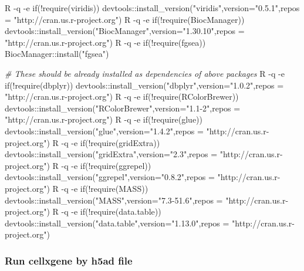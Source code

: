 \documentclass[
]{article}
\newenvironment{Shaded}{\begin{snugshade}}{\end{snugshade}}
\newcommand{\AttributeTok}[1]{\textcolor[rgb]{0.77,0.63,0.00}{#1}}
\newcommand{\CommentTok}[1]{\textcolor[rgb]{0.56,0.35,0.01}{\textit{#1}}}
\newcommand{\ExtensionTok}[1]{#1}
\newcommand{\StringTok}[1]{\textcolor[rgb]{0.31,0.60,0.02}{#1}}
\begin{document}
\begin{Shaded}
\begin{Highlighting}[]
\ExtensionTok{R} \AttributeTok{{-}q} \AttributeTok{{-}e} \StringTok{\textquotesingle{}if(!require(viridis)) devtools::install\_version("viridis",version="0.5.1",repos = "http://cran.us.r{-}project.org")\textquotesingle{}}
\ExtensionTok{R} \AttributeTok{{-}q} \AttributeTok{{-}e} \StringTok{\textquotesingle{}if(!require(BiocManager)) devtools::install\_version("BiocManager",version="1.30.10",repos = "http://cran.us.r{-}project.org")\textquotesingle{}}
\ExtensionTok{R} \AttributeTok{{-}q} \AttributeTok{{-}e} \StringTok{\textquotesingle{}if(!require(fgsea)) BiocManager::install("fgsea")\textquotesingle{}}

\CommentTok{\# These should be already installed as dependencies of above packages}
\ExtensionTok{R} \AttributeTok{{-}q} \AttributeTok{{-}e} \StringTok{\textquotesingle{}if(!require(dbplyr)) devtools::install\_version("dbplyr",version="1.0.2",repos = "http://cran.us.r{-}project.org")\textquotesingle{}}
\ExtensionTok{R} \AttributeTok{{-}q} \AttributeTok{{-}e} \StringTok{\textquotesingle{}if(!require(RColorBrewer)) devtools::install\_version("RColorBrewer",version="1.1{-}2",repos = "http://cran.us.r{-}project.org")\textquotesingle{}}
\ExtensionTok{R} \AttributeTok{{-}q} \AttributeTok{{-}e} \StringTok{\textquotesingle{}if(!require(glue)) devtools::install\_version("glue",version="1.4.2",repos = "http://cran.us.r{-}project.org")\textquotesingle{}}
\ExtensionTok{R} \AttributeTok{{-}q} \AttributeTok{{-}e} \StringTok{\textquotesingle{}if(!require(gridExtra)) devtools::install\_version("gridExtra",version="2.3",repos = "http://cran.us.r{-}project.org")\textquotesingle{}}
\ExtensionTok{R} \AttributeTok{{-}q} \AttributeTok{{-}e} \StringTok{\textquotesingle{}if(!require(ggrepel)) devtools::install\_version("ggrepel",version="0.8.2",repos = "http://cran.us.r{-}project.org")\textquotesingle{}}
\ExtensionTok{R} \AttributeTok{{-}q} \AttributeTok{{-}e} \StringTok{\textquotesingle{}if(!require(MASS)) devtools::install\_version("MASS",version="7.3{-}51.6",repos = "http://cran.us.r{-}project.org")\textquotesingle{}}
\ExtensionTok{R} \AttributeTok{{-}q} \AttributeTok{{-}e} \StringTok{\textquotesingle{}if(!require(data.table)) devtools::install\_version("data.table",version="1.13.0",repos = "http://cran.us.r{-}project.org")\textquotesingle{}}
\end{Highlighting}
\end{Shaded}

\hypertarget{run-cellxgene-by-h5ad-file}{%
\subsubsection{Run cellxgene by h5ad file}\label{run-cellxgene-by-h5ad-file}}
\end{document}
